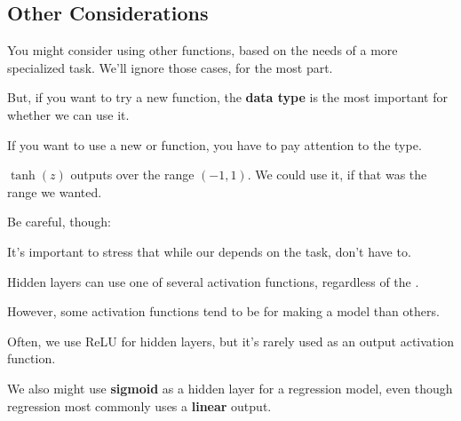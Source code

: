     \subsecdiv{}

    \subsection*{Other Considerations}
    
        You might consider using other functions, based on the needs of a more specialized task. We'll ignore those cases, for the most part.
        
        But, if you want to try a new function, the \textbf{data type} is the most important for whether we can use it.\\
    
        \begin{concept}
            If you want to use a new  or  function, you have to pay attention to the  type.
        \end{concept}
    
        \miniex $\tanh(z)$ outputs over the range $(-1, 1)$. We could use it, if that was the range we wanted.
    
        Be careful, though:\\
    
        \begin{clarification}
            It's important to stress that while our  depends on the task,  don't have to.
    
            Hidden layers can use one of several  activation functions, regardless of the .

            However, some activation functions tend to be  for making a model than others.
        \end{clarification}
    
        \miniex Often, we use ReLU for hidden layers, but it's rarely used as an output activation function. 
        
        We also might use \textbf{sigmoid} as a hidden layer for a regression model, even though regression most commonly uses a \textbf{linear} output.